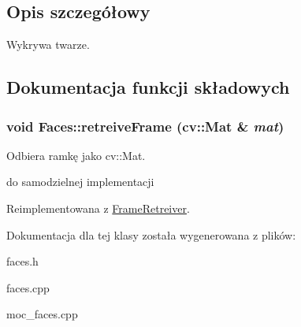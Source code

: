 \subsection{Opis szczegółowy}
Wykrywa twarze. 

\subsection{Dokumentacja funkcji składowych}
\hypertarget{class_faces_a7fd92e73e117b72898097551b964fd96}{
\subsubsection[{retreiveFrame}]{\setlength{\rightskip}{0pt plus 5cm}void Faces::retreiveFrame (cv::Mat \& {\em mat})}}
\label{class_faces_a7fd92e73e117b72898097551b964fd96}


Odbiera ramkę jako cv::Mat. 

do samodzielnej implementacji 

Reimplementowana z \hyperlink{class_frame_retreiver_a72912583af45c00d267f215a0d0b9bb1}{FrameRetreiver}.



Dokumentacja dla tej klasy została wygenerowana z plików:\begin{DoxyCompactItemize}
\item 
faces.h\item 
faces.cpp\item 
moc\_\-faces.cpp\end{DoxyCompactItemize}
